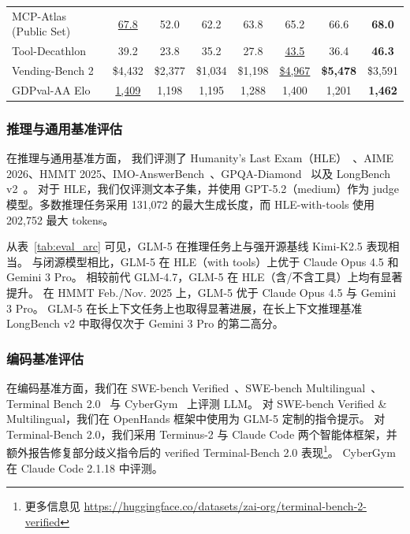 \begin{table}[htbp]
\begin{tabular}{lccccccc}
MCP-Atlas (Public Set) & \underline{67.8} & 52.0 & 62.2 & 63.8 & 65.2 & 66.6 & \textbf{68.0} \\
Tool-Decathlon & 39.2 & 23.8 & 35.2 & 27.8 & \underline{43.5} & 36.4 & \textbf{46.3} \\
Vending-Bench 2 & \$4,432 & \$2,377 & \$1,034 & \$1,198 & \underline{\$4,967} & \textbf{\$5,478} & \$3,591 \\
GDPval-AA Elo & \underline{1,409} & 1,198 & 1,195 & 1,288 & 1,400 & 1,201 & \textbf{1,462} \\
\bottomrule
\end{tabular}
\end{table}




\subsubsection{推理与通用基准评估}

在推理与通用基准方面，
我们评测了 Humanity’s Last Exam（HLE）~\cite{phan2025humanity}、AIME 2026、HMMT 2025、IMO-AnswerBench~\cite{luong2025towards}、GPQA-Diamond~\cite{rein2024gpqa} 以及 LongBench v2~\cite{bai-etal-2025-longbench}。
对于 HLE，我们仅评测文本子集，并使用 GPT-5.2（medium）作为 judge 模型。多数推理任务采用 131,072 的最大生成长度，而 HLE-with-tools 使用 202,752 最大 tokens。

从表~\ref{tab:eval_arc} 可见，GLM-5 在推理任务上与强开源基线 Kimi-K2.5 表现相当。
与闭源模型相比，GLM-5 在 HLE（with tools）上优于 Claude Opus 4.5 和 Gemini 3 Pro。
相较前代 GLM-4.7，GLM-5 在 HLE（含/不含工具）上均有显著提升。
在 HMMT Feb./Nov. 2025 上，GLM-5 优于 Claude Opus 4.5 与 Gemini 3 Pro。
GLM-5 在长上下文任务上也取得显著进展，在长上下文推理基准 LongBench v2 中取得仅次于 Gemini 3 Pro 的第二高分。


\subsubsection{编码基准评估}

在编码基准方面，我们在 SWE-bench Verified~\cite{jimenez2023swe}、SWE-bench Multilingual~\cite{yang2025swemulti}、Terminal Bench 2.0~\cite{tbench_2025} 与 CyberGym~\cite{wang2025cybergym} 上评测 LLM。
对 SWE-bench Verified \& Multilingual，我们在 OpenHands 框架中使用为 GLM-5 定制的指令提示。
对 Terminal-Bench 2.0，我们采用 Terminus-2 与 Claude Code 两个智能体框架，并额外报告修复部分歧义指令后的 verified Terminal-Bench 2.0 表现\footnote{更多信息见 \url{https://huggingface.co/datasets/zai-org/terminal-bench-2-verified}}。
CyberGym 在 Claude Code 2.1.18 中评测。

